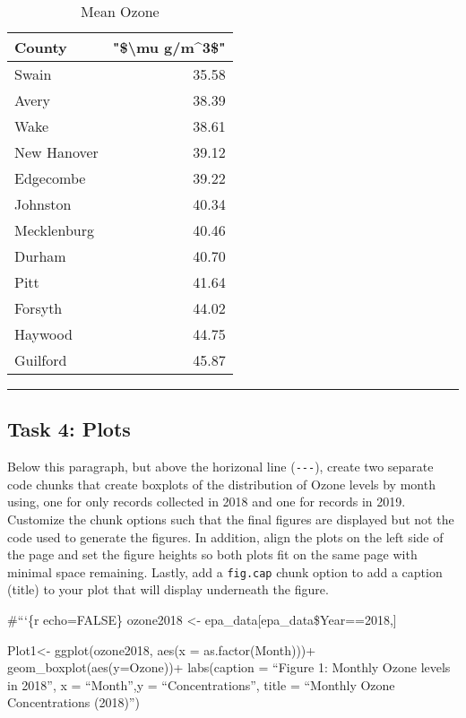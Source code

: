\documentclass[
]{article}
\begin{document}
\begin{table}
\begin{table}
\caption{\label{tab:data.summary}Mean Ozone}
\centering
\begin{tabular}[t]{l|r}
\hline
County & "\$\textbackslash{}mu g/m\textasciicircum{}3\$"\\
\hline
Swain & 35.58\\
\hline
Avery & 38.39\\
\hline
Wake & 38.61\\
\hline
New Hanover & 39.12\\
\hline
Edgecombe & 39.22\\
\hline
Johnston & 40.34\\
\hline
Mecklenburg & 40.46\\
\hline
Durham & 40.70\\
\hline
Pitt & 41.64\\
\hline
Forsyth & 44.02\\
\hline
Haywood & 44.75\\
\hline
Guilford & 45.87\\
\hline
\end{tabular}
\end{table}
\end{table}

\begin{center}\rule{0.5\linewidth}{0.5pt}\end{center}

\subsection{Task 4: Plots}\label{task-4-plots}

Below this paragraph, but above the horizonal line (\texttt{-\/-\/-}),
create two separate code chunks that create boxplots of the distribution
of Ozone levels by month using, one for only records collected in 2018
and one for records in 2019. Customize the chunk options such that the
final figures are displayed but not the code used to generate the
figures. In addition, align the plots on the left side of the page and
set the figure heights so both plots fit on the same page with minimal
space remaining. Lastly, add a \texttt{fig.cap} chunk option to add a
caption (title) to your plot that will display underneath the figure.

\newpage

\#```\{r echo=FALSE\} ozone2018 \textless-
epa\_data{[}epa\_data\$Year==2018,{]}

Plot1\textless- ggplot(ozone2018, aes(x = as.factor(Month)))+
geom\_boxplot(aes(y=Ozone))+ labs(caption = ``Figure 1: Monthly Ozone
levels in 2018'', x = ``Month'',y = ``Concentrations'', title =
``Monthly Ozone Concentrations (2018)'')
\end{document}
